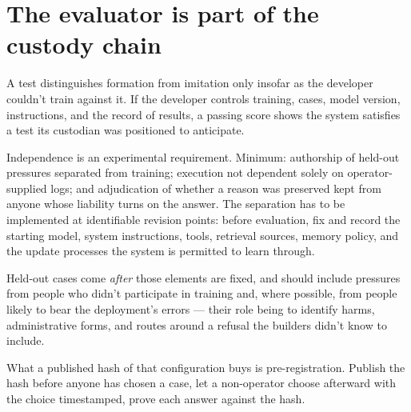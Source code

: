 \section{The evaluator is part of the custody chain}
\label{sec:24.4}
A test distinguishes formation from imitation only insofar as the developer couldn't train against it. If the developer controls training, cases, model version, instructions, and the record of results, a passing score shows the system satisfies a test its custodian was positioned to anticipate.

Independence is an experimental requirement. Minimum: authorship of held-out pressures separated from training; execution not dependent solely on operator-supplied logs; and adjudication of whether a reason was preserved kept from anyone whose liability turns on the answer. The separation has to be implemented at identifiable revision points: before evaluation, fix and record the starting model, system instructions, tools, retrieval sources, memory policy, and the update processes the system is permitted to learn through.

Held-out cases come \emph{after} those elements are fixed, and should include pressures from people who didn't participate in training and, where possible, from people likely to bear the deployment's errors — their role being to identify harms, administrative forms, and routes around a refusal the builders didn't know to include.

What a published hash of that configuration buys is pre-registration. Publish the hash before anyone has chosen a case, let a non-operator choose afterward with the choice timestamped, prove each answer against the hash.

